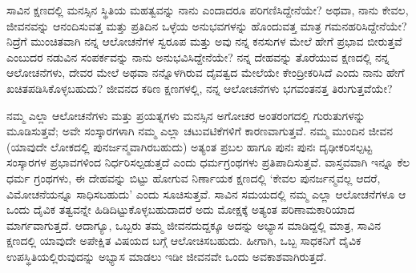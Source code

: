 
\newpage
\begin{mananam}{}
\nfntmtxt ಸಾವಿನ ಕ್ಷಣದಲ್ಲಿ ಮನಸ್ಸಿನ ಸ್ಥಿತಿಯ ಮಹತ್ವವನ್ನು ನಾನು ಎಂದಾದರೂ ಪರಿಗಣಿಸಿದ್ದೇನೆಯೇ?  ಅಥವಾ, ನಾನು ಕೇವಲ, ಜೀವನವನ್ನು ಆನಂದಿಸುವತ್ತ ಮತ್ತು ಪ್ರತಿದಿನ ಒಳ್ಳೆಯ ಅನುಭವಗಳನ್ನು ಹೊಂದುವತ್ತ ಮಾತ್ರ ಗಮನಹರಿಸಿದ್ದೇನೆಯೇ? ನಿದ್ರೆಗೆ ಮುಂಚಿತವಾಗಿ ನನ್ನ ಆಲೋಚನೆಗಳ ಸ್ವರೂಪ ಮತ್ತು ಅವು ನನ್ನ ಕನಸುಗಳ ಮೇಲೆ ಹೇಗೆ ಪ್ರಭಾವ ಬೀರುತ್ತವೆ ಎಂಬುದರ ನಡುವಿನ ಸಂಪರ್ಕವನ್ನು ನಾನು ಅನುಭವಿಸಿದ್ದೇನೆಯೇ? 
ನನ್ನ ದೇಹವನ್ನು ತೊರೆಯುವ ಕ್ಷಣದಲ್ಲಿ ನನ್ನ ಆಲೋಚನೆಗಳು,  ದೇವರ ಮೇಲೆ ಅಥವಾ ನನ್ನೊಳಗಿರುವ ದೈವತ್ವದ ಮೇಲೆಯೇ ಕೇಂದ್ರೀಕರಿಸಿದೆ ಎಂದು ನಾನು ಹೇಗೆ ಖಚಿತಪಡಿಸಿಕೊಳ್ಳಬಹುದು? ಜೀವನದ ಕಠಿಣ ಕ್ಷಣಗಳಲ್ಲಿ, ನನ್ನ ಆಲೋಚನೆಗಳು ಭಗವಂತನತ್ತ ತಿರುಗುತ್ತವೆಯೇ?
\end{mananam}
\sReflect
\begin{inspiration}{}
\nfntmtxt \footnotesize ನಮ್ಮ ಎಲ್ಲಾ ಆಲೋಚನೆಗಳು ಮತ್ತು ಪ್ರಯತ್ನಗಳು ಮನಸ್ಸಿನ ಅಗೋಚರ ಅಂತರಂಗದಲ್ಲಿ ಗುರುತುಗಳನ್ನು ಮೂಡಿಸುತ್ತವೆ; ಅವೇ ಸಂಸ್ಕಾರಗಳಾಗಿ ನಮ್ಮ ಎಲ್ಲಾ ಚಟುವಟಿಕೆಗಳಿಗೆ ಕಾರಣವಾಗುತ್ತವೆ.
ನಮ್ಮ ಮುಂದಿನ ಜೀವನ (ಯಾವುದೇ ಲೋಕದಲ್ಲಿ ಪುನರ್ಜನ್ಮವಾಗಿರಬಹುದು) ಅತ್ಯಂತ ಪ್ರಬಲ ಹಾಗೂ ಪುನಃ ಪುನಃ ದೃಢೀಕರಿಸಲ್ಪಟ್ಟ ಸಂಸ್ಕಾರಗಳ ಪ್ರಭಾವಗಳಿಂದ ನಿರ್ಧರಿಸಲ್ಪಡುತ್ತದೆ ಎಂದು ಧರ್ಮಗ್ರಂಥಗಳು ಪ್ರತಿಪಾದಿಸುತ್ತವೆ.  
ವಾಸ್ತವವಾಗಿ ಇನ್ನೂ ಕೆಲ ಧರ್ಮ ಗ್ರಂಥಗಳು, ಈ ದೇಹವನ್ನು ಬಿಟ್ಟು ಹೋಗುವ ನಿರ್ಣಾಯಕ ಕ್ಷಣದಲ್ಲಿ ‘ಕೇವಲ ಪುನರ್ಜನ್ಮವಲ್ಲ ಆದರೆ, ವಿಮೋಚನೆಯನ್ನೂ ಸಾಧಿಸಬಹುದು’ ಎಂದು ಸೂಚಿಸುತ್ತವೆ. ಸಾವಿನ ಸಮಯದಲ್ಲಿ ನಮ್ಮ ಎಲ್ಲಾ ಆಲೋಚನೆಗಳೂ ಆ ಒಂದು ದೈವಿಕ ತತ್ವವನ್ನೇ ಹಿಡಿದಿಟ್ಟುಕೊಳ್ಳಬಹುದಾದರೆ  ಅದು ಮೋಕ್ಷಕ್ಕೆ ಅತ್ಯಂತ ಪರಿಣಾಮಕಾರಿಯಾದ ಮಾರ್ಗವಾಗುತ್ತದೆ. 
ಆದಾಗ್ಯೂ, ಒಬ್ಬರು ತಮ್ಮ ಜೀವನದುದ್ದಕ್ಕೂ ಅದನ್ನು ಅಭ್ಯಾಸ ಮಾಡಿದ್ದಲ್ಲಿ ಮಾತ್ರ, ಸಾವಿನ ಕ್ಷಣದಲ್ಲಿ ಯಾವುದೇ ಅಪೇಕ್ಷಿತ ವಿಷಯದ ಬಗ್ಗೆ  ಆಲೋಚಿಸಬಹುದು. ಹೀಗಾಗಿ, ಒಬ್ಬ ಸಾಧಕನಿಗೆ ದೈವಿಕ ಉಪಸ್ಥಿತಿಯಲ್ಲಿರುವುದನ್ನು ಅಭ್ಯಾಸ ಮಾಡಲು ಇಡೀ ಜೀವನವೇ ಒಂದು ಅವಕಾಶವಾಗಿರುತ್ತದೆ. 
\end{inspiration}
\newpage

